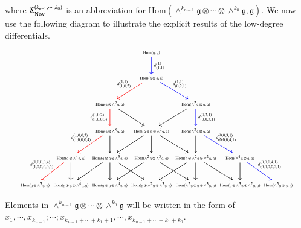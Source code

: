 \documentclass[12pt]{amsart}
\theoremstyle{definition}
\newcommand{\g}{\mathfrak g}
\newcommand{\frkC}{\mathfrak C}
\newcommand{\Hom}{\mathrm{Hom}}
\newcommand{\ot}{\otimes}
\newcommand{\nov}{{\rm Nov}}
\begin{document}
where $\frkC_\nov^{(k_{n-1},\cdots,k_0)}$ is an abbreviation for $\Hom(\wedge^{k_{n-1}}\g\ot\cdots\ot\wedge^{k_0}\g,\g)$.
We now use the following diagram to illustrate the explicit results of the low-degree differentials.
\begin{equation}\label{diagram-Nov-cohomology}
{\tiny
\xymatrix@C=-3.7pt@R=20pt{
&&&&&
&\Hom(\g,\g)
\ar@[blue][d]^-{d^{(1)}_{(1,1)}}
&&&&&
\\
&&&&&
&\Hom(\g\otimes\g,\g)
\ar@[red][dll]_-{d^{(1,1)}_{(1,0,2)}}
\ar@[blue][drr]^-{d^{(1,1)}_{(0,2,1)}}
&&&&&
\\
&&&&\Hom(\g\otimes\wedge^2\g,\g)
\ar@[red][d]_-{d^{(1,0,2)}_{(1,0,0,3)}}
\ar[drr]
&
&
&
&\Hom(\wedge^2\g\otimes\g,\g)
\ar[dll]
\ar@[blue][d]^-{d^{(0,2,1)}_{(0,0,3,1)}}
&&&
\\
&&&
&\Hom(\g\otimes\wedge^3\g,\g)
\ar@[red][dll]_-{d^{(1,0,0,3)}_{(1,0,0,0,4)}}
\ar[d]
&
&\Hom(\g\otimes\g\otimes\wedge^2\g,\g)
\ar[dll]
\ar[d]
\ar[drr]
&
&\Hom(\wedge^3\g\otimes\g,\g)
\ar@[blue][drr]^-{d^{(0,0,3,1)}_{(0,0,0,4,1)}}
\ar[d]
&&&
\\
&
&\Hom(\g\otimes\wedge^4\g,\g)
\ar@[red][dll]_-{d^{(1,0,0,0,4)}_{(1,0,0,0,0,5)}}
\ar[d]
&
&\Hom(\g\otimes\g\otimes\wedge^3\g,\g)
\ar[dll]
\ar[d]
\ar[drr]
&
&\Hom(\wedge^2\g\otimes\wedge^3\g,\g)
\ar[dll]
\ar[drr]
&
&\Hom(\g\otimes\wedge^2\g\otimes\wedge^2\g,\g)
\ar[dll]
\ar[d]
\ar[drr]
&
&\Hom(\wedge^4\g\otimes\g,\g)
\ar@[blue][drr]^-{d^{(0,0,0,4,1)}_{(0,0,0,0,5,1)}}
\ar[d]
&
\\
\Hom(\g\otimes\wedge^5\g,\g)
&
&\Hom(\g\otimes\g\otimes\wedge^4\g,\g)
&
&\Hom(\g\otimes\g\otimes\wedge^4\g,\g)
&
&\Hom(\g\otimes\wedge^2\g\otimes\wedge^3\g,\g)
&
&\Hom(\wedge^2\g\otimes\g\otimes\wedge^3\g,\g)
&
&\Hom(\g\otimes\wedge^3\g\otimes\wedge^2\g,\g)
&
&\Hom(\wedge^5\g\otimes\g,\g)
}
}
\end{equation}


Elements in $\wedge^{k_{n-1}}\g\ot\cdots\ot\wedge^{k_0}\g$ will be written in the form of $x_1,\cdots,x_{k_{n-1}};\cdots;x_{k_{n-1}+\cdots+k_1+1},\cdots,x_{k_{n-1}+\cdots+k_1+k_0}$.
\end{document}
